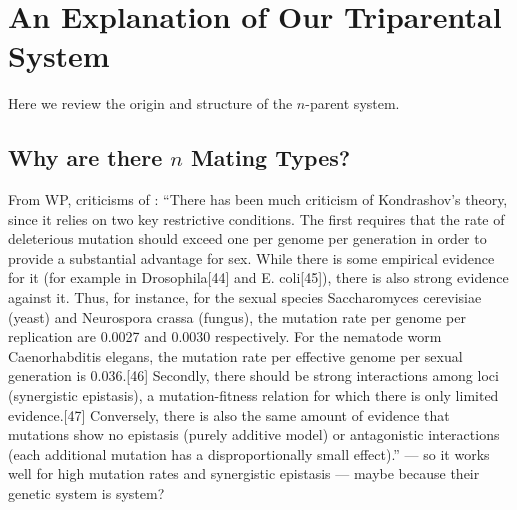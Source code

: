 

\section{An Explanation of Our Triparental System}

Here we review the origin and structure of the $n$-parent system.


\subsection{Why are there $n$ Mating Types?}



From WP, criticisms of \cite{kondrashov_deleterious_1988}: ``There has been much criticism of Kondrashov's theory, since it relies on two key restrictive conditions. The first requires that the rate of deleterious mutation should exceed one per genome per generation in order to provide a substantial advantage for sex. While there is some empirical evidence for it (for example in Drosophila[44] and E. coli[45]), there is also strong evidence against it. Thus, for instance, for the sexual species Saccharomyces cerevisiae (yeast) and Neurospora crassa (fungus), the mutation rate per genome per replication are 0.0027 and 0.0030 respectively. For the nematode worm Caenorhabditis elegans, the mutation rate per effective genome per sexual generation is 0.036.[46] Secondly, there should be strong interactions among loci (synergistic epistasis), a mutation-fitness relation for which there is only limited evidence.[47] Conversely, there is also the same amount of evidence that mutations show no epistasis (purely additive model) or antagonistic interactions (each additional mutation has a disproportionally small effect).'' --- so it works well for high mutation rates and synergistic epistasis --- maybe because their genetic system is system?



